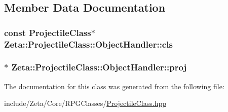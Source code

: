 \subsection{Member Data Documentation}
\hypertarget{classZeta_1_1ProjectileClass_1_1ObjectHandler_a8ef2409521566f3668ecda356e6ef23f}{
\subsubsection[{cls}]{\setlength{\rightskip}{0pt plus 5cm}const {\bf Projectile\+Class}$\ast$ Zeta\+::\+Projectile\+Class\+::\+Object\+Handler\+::cls\hspace{0.3cm}{\ttfamily [private]}}}\label{classZeta_1_1ProjectileClass_1_1ObjectHandler_a8ef2409521566f3668ecda356e6ef23f}
\hypertarget{classZeta_1_1ProjectileClass_1_1ObjectHandler_ae64fa3eda0a7d808ad809694edb6fe73}{
\subsubsection[{proj}]{$\ast$ Zeta\+::\+Projectile\+Class\+::\+Object\+Handler\+::proj\hspace{0.3cm}{\ttfamily [private]}}}\label{classZeta_1_1ProjectileClass_1_1ObjectHandler_ae64fa3eda0a7d808ad809694edb6fe73}


The documentation for this class was generated from the following file\+:\begin{DoxyCompactItemize}
\item 
include/\+Zeta/\+Core/\+R\+P\+G\+Classes/\hyperlink{ProjectileClass_8hpp}{Projectile\+Class.\+hpp}\end{DoxyCompactItemize}
